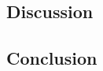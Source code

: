 \subsection{Discussion} \label{sec:exp_discussion}

\subsection{Conclusion} \label{sec:exp_conclusion}

